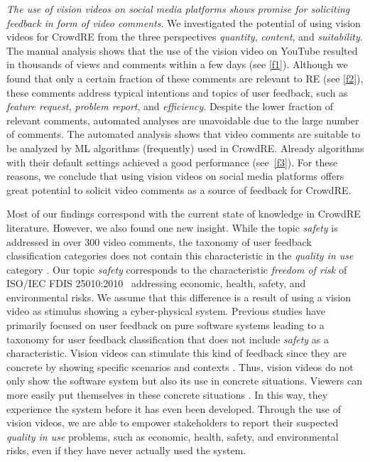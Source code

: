 \documentclass[conference]{IEEEtran}
\begin{document}
{\textit{The use of vision videos on social media platforms shows promise for soliciting feedback in form of video comments}. We investigated the potential of using vision videos for CrowdRE from the three perspectives \textit{quantity}, \textit{content}, and \textit{suitability}. 
The manual analysis shows that the use of the vision video on YouTube resulted in thousands of views and comments within a few days (see \ref{f1}). Although we found that only a certain fraction of these comments are relevant to RE (see \ref{f2}), these comments address typical intentions and topics of user feedback, such as \textit{feature request}, \textit{problem report}, and \textit{efficiency}. Despite the lower fraction of relevant comments, automated analyses are unavoidable due to the large number of comments. The automated analysis shows that video comments are suitable to be analyzed by ML algorithms (frequently) used in CrowdRE. Already algorithms with their default settings achieved a good performance (see~\ref{f3}). For these reasons, we conclude that using vision videos on social media platforms offers great potential to solicit video comments as a source of feedback for CrowdRE.

Most of our findings correspond with the current state of knowledge in CrowdRE literature. However, we also found one new insight. While the topic \textit{safety} is addressed in over 300 video comments, the taxonomy of user feedback classification categories does not contain this characteristic in the \textit{quality in use} category \cite{Santos.2019}. Our topic \textit{safety} corresponds to the characteristic \textit{freedom of risk} of ISO/IEC FDIS 25010:2010~\cite{ISO25010.2010} addressing economic, health, safety, and environmental risks. We assume that this difference is a result of using a vision video as stimulus showing a cyber-physical system. Previous studies have primarily focused on user feedback on pure software systems leading to a taxonomy for user feedback classification \cite{Santos.2019} that does not include \textit{safety} as a characteristic.
Vision videos can stimulate this kind of feedback since they are concrete by showing specific scenarios and contexts \cite{Karras.2016}. Thus, vision videos do not only show the software system but also its use in concrete situations. Viewers can more easily put themselves in these concrete situations \cite{Ferrari.2015, Liskin.2015, Busch.2020}. In this way, they experience the system before it has even been developed. Through the use of vision videos, we are able to empower stakeholders to report their suspected \textit{quality in use} problems, such as economic, health, safety, and environmental risks, even if they have never actually used the system.

}
\end{document}
